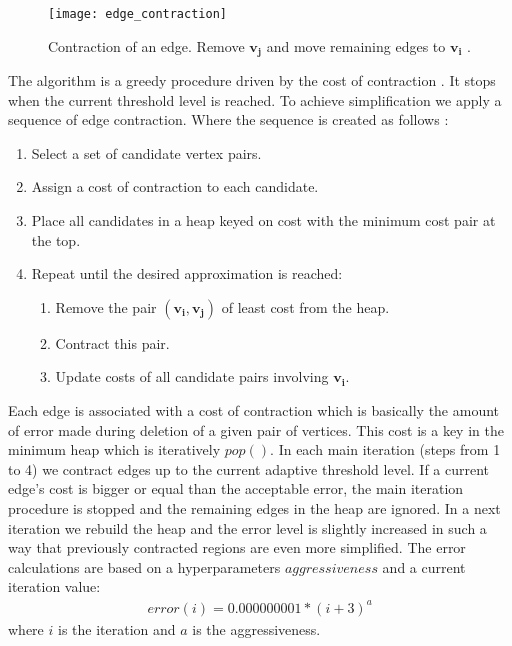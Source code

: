 \begin{figure}[h!]
  \begin{center}
    \texttt{[image: edge\_contraction]}
    \caption{Contraction of an edge. Remove $\mathbf{v_j}$ and move remaining edges to $\mathbf{v_i}$ \cite{garland99}.}
    \label{fig:edge_contraction_ref}
  \end{center}
\end{figure}

The algorithm is a greedy procedure driven by the cost of contraction \cite{cormen01}. It stops when the current threshold level is reached. To achieve simplification we apply a sequence of edge contraction. Where the sequence is created as follows \cite{garland97}:

\begin{enumerate}
\item Select a set of candidate vertex pairs.
\item Assign a cost of contraction to each candidate.
\item Place all candidates in a heap keyed on cost with the minimum cost pair at the top.
\item Repeat until the desired approximation is reached:
\begin{enumerate}
\item Remove the pair $(\mathbf{v_i}, \mathbf{v_j})$ of least cost from the heap.
\item Contract this pair.
\item Update costs of all candidate pairs involving $\mathbf{v_i}$.
\end{enumerate}
\end{enumerate}

Each edge is associated with a cost of contraction which is basically the amount of error made during deletion of a given pair of vertices. This cost is a key in the minimum heap \cite{cormen01} which is iteratively $pop()$. In each main iteration (steps from 1 to 4) we contract edges up to the current adaptive threshold level. If a current edge's cost is bigger or equal than the acceptable error, the main iteration procedure is stopped and the remaining edges in the heap are ignored. In a next iteration we rebuild the heap and the error level is slightly increased in such a way that previously contracted regions are even more simplified. The error calculations are based on a hyperparameters $aggressiveness$ and a current iteration value:
\begin{align}
error(i)=0.000000001*(i+3)^a
\label{error_formula}
\end{align}
where $i$ is the iteration and $a$ is the aggressiveness.

